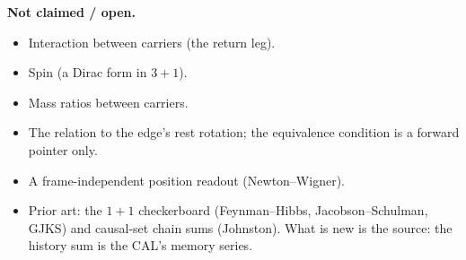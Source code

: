 \documentclass[10pt]{article}
\begin{document}
\textbf{Not claimed / open.}
\begin{itemize}\setlength{\itemsep}{0pt}
\item Interaction between carriers (the return leg).
\item Spin (a Dirac form in $3+1$).
\item Mass ratios between carriers.
\item The relation to the edge's rest rotation; the equivalence condition is a forward pointer only.
\item A frame-independent position readout (Newton--Wigner).
\item Prior art: the $1+1$ checkerboard (Feynman--Hibbs, Jacobson--Schulman, GJKS) and causal-set chain sums (Johnston). What is new is the source: the history sum is the CAL's memory series.
\end{itemize}
\end{document}

